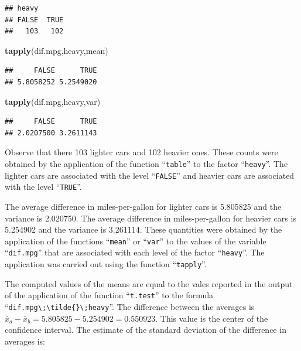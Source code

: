 \documentclass[]{krantz}
\makeatletter
\newenvironment{Shaded}{\begin{snugshade}}{\end{snugshade}}
\newcommand{\KeywordTok}[1]{\textcolor[rgb]{0.13,0.29,0.53}{\textbf{#1}}}
\newcommand{\NormalTok}[1]{#1}
\newenvironment{kframe}{%
\medskip{}
\setlength{\fboxsep}{.8em}
 \def\at@end@of@kframe{}%
 \ifinner\ifhmode%
  \def\at@end@of@kframe{\end{minipage}}%
  \begin{minipage}{\columnwidth}%
 \fi\fi%
 \def\FrameCommand##1{\hskip\@totalleftmargin \hskip-\fboxsep
 \colorbox{shadecolor}{##1}\hskip-\fboxsep
     \hskip-\linewidth \hskip-\@totalleftmargin \hskip\columnwidth}%
 \MakeFramed {\advance\hsize-\width
   \@totalleftmargin\z@ \linewidth\hsize
   \@setminipage}}%
 {\par\unskip\endMakeFramed%
 \at@end@of@kframe}
\renewenvironment{Shaded}{\begin{kframe}}{\end{kframe}}
\theoremstyle{definition}
\theoremstyle{definition}
\theoremstyle{definition}
\theoremstyle{remark}
\makeatother
\begin{document}
\begin{verbatim}
## heavy
## FALSE  TRUE 
##   103   102
\end{verbatim}

\begin{Shaded}
\begin{Highlighting}[]
\KeywordTok{tapply}\NormalTok{(dif.mpg,heavy,mean)}
\end{Highlighting}
\end{Shaded}

\begin{verbatim}
##     FALSE      TRUE 
## 5.8058252 5.2549020
\end{verbatim}

\begin{Shaded}
\begin{Highlighting}[]
\KeywordTok{tapply}\NormalTok{(dif.mpg,heavy,var)}
\end{Highlighting}
\end{Shaded}

\begin{verbatim}
##     FALSE      TRUE 
## 2.0207500 3.2611143
\end{verbatim}

Observe that there 103 lighter cars and 102 heavier ones. These counts
were obtained by the application of the function ``\texttt{table}'' to the factor
``\texttt{heavy}''. The lighter cars are associated with the level ``\texttt{FALSE}'' and
heavier cars are associated with the level ``\texttt{TRUE}''.

The average difference in miles-per-gallon for lighter cars is 5.805825
and the variance is 2.020750. The average difference in miles-per-gallon
for heavier cars is 5.254902 and the variance is 3.261114. These
quantities were obtained by the application of the functions ``\texttt{mean}'' or
``\texttt{var}'' to the values of the variable ``\texttt{dif.mpg}'' that are associated
with each level of the factor ``\texttt{heavy}''. The application was carried out
using the function ``\texttt{tapply}''.

The computed values of the means are equal to the vales reported in the
output of the application of the function ``\texttt{t.test}'' to the formula
``\texttt{dif.mpg\textbackslash{};\textbackslash{}tilde\{\}\textbackslash{};heavy}''. The difference between the averages is
\(\bar x_a - \bar x_b = 5.805825 - 5.254902 = 0.550923\). This value is
the center of the confidence interval. The estimate of the standard
deviation of the difference in averages is:
\end{document}
